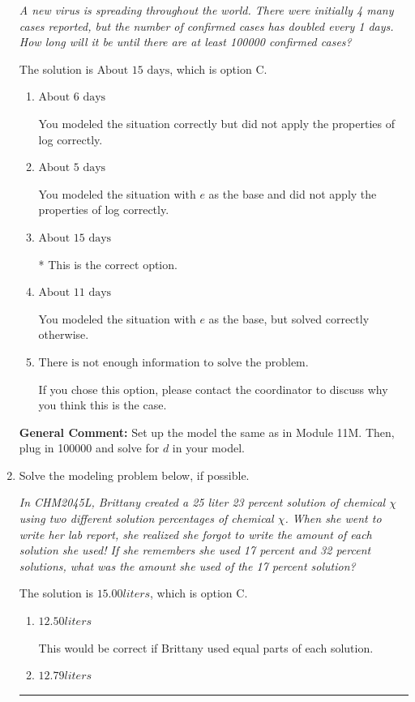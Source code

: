 \documentclass{extbook}[14pt]
\newcommand{\litem}[1]{\item #1

\rule{\textwidth}{0.4pt}}
\begin{document}
\begin{enumerate}
{\begin{center}
    \textit{ A new virus is spreading throughout the world. There were initially 4 many cases reported, but the number of confirmed cases has doubled every 1 days. How long will it be until there are at least 100000 confirmed cases? }
\end{center}
The solution is \( \text{About } 15 \text{ days} \), which is option C.\begin{enumerate}[label=\Alph*.]
\item \( \text{About } 6 \text{ days} \)

You modeled the situation correctly but did not apply the properties of log correctly.
\item \( \text{About } 5 \text{ days} \)

You modeled the situation with $e$ as the base and did not apply the properties of log correctly.
\item \( \text{About } 15 \text{ days} \)

* This is the correct option.
\item \( \text{About } 11 \text{ days} \)

You modeled the situation with $e$ as the base, but solved correctly otherwise.
\item \( \text{There is not enough information to solve the problem.} \)

If you chose this option, please contact the coordinator to discuss why you think this is the case.
\end{enumerate}

\textbf{General Comment:} Set up the model the same as in Module 11M. Then, plug in 100000 and solve for $d$ in your model.
}
\litem{
Solve the modeling problem below, if possible.

\begin{center}
    \textit{ In CHM2045L, Brittany created a 25 liter 23 percent solution of chemical $\chi$ using two different solution percentages of chemical $\chi$. When she went to write her lab report, she realized she forgot to write the amount of each solution she used! If she remembers she used 17 percent and 32 percent solutions, what was the amount she used of the 17 percent solution? }
\end{center}
The solution is \( 15.00 liters \), which is option C.\begin{enumerate}[label=\Alph*.]
\item \( 12.50 liters \)

This would be correct if Brittany used equal parts of each solution.
\item \( 12.79 liters \)


\end{enumerate}}
\end{enumerate}
\end{document}
